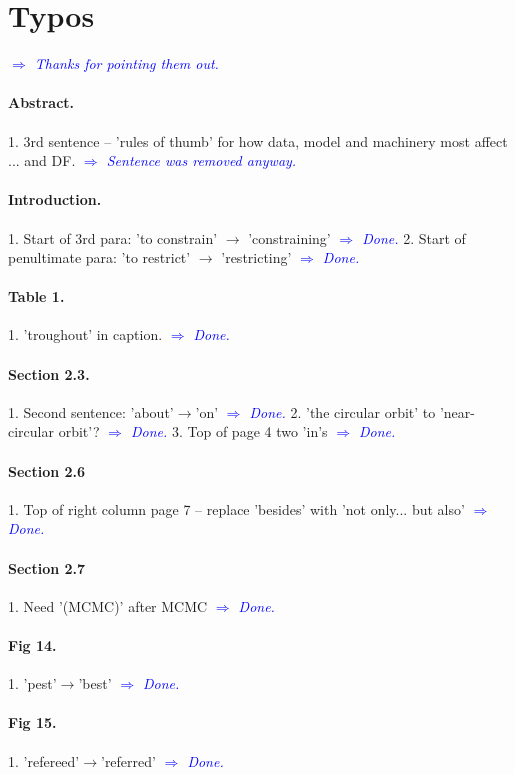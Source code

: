 \documentclass[10pt,a4paper]{article}
\newcommand{\Comment}[1]{\textsl{\textcolor{Blue}{$\Longrightarrow$ {#1}}}}
\begin{document}
\section{Typos}

 \Comment{Thanks for pointing them out.}

\paragraph{Abstract.} 1. 3rd sentence -- 'rules of thumb' for how data, model and machinery most affect ... and DF. \Comment{Sentence was removed anyway.}

\paragraph{Introduction.} 1. Start of 3rd para: 'to constrain' $\rightarrow$ 'constraining'  \Comment{Done.} 2. Start of penultimate para: 'to restrict' $\rightarrow$ 'restricting' \Comment{Done.}

\paragraph{Table 1.} 1. 'troughout' in caption. \Comment{Done.}

\paragraph{Section 2.3.} 1. Second sentence: 'about'$\rightarrow$'on' \Comment{Done.} 2. 'the circular orbit' to 'near-circular orbit'? \Comment{Done.} 3. Top of page 4 two 'in's \Comment{Done.}

\paragraph{Section 2.6} 1. Top of right column page 7 -- replace 'besides' with 'not only... but also' \Comment{Done.}

\paragraph{Section 2.7} 1. Need '(MCMC)' after MCMC \Comment{Done.}

\paragraph{Fig 14.} 1. 'pest'$\rightarrow$'best' \Comment{Done.}

\paragraph{Fig 15.} 1. 'refereed'$\rightarrow$'referred'  \Comment{Done.}
\end{document}
